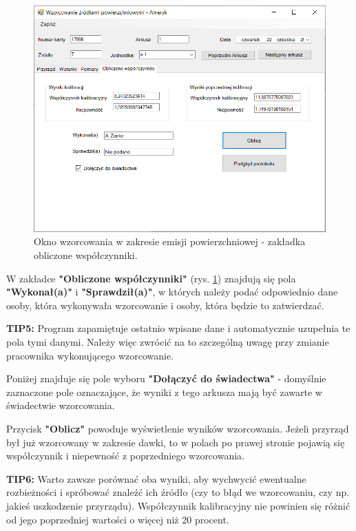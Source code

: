 	\begin{figure}[htb]
		\centering
		\includegraphics[width=\columnwidth]{obrazki/Wzorcowanie/emisja/wspolczynniki.png}
		\caption{Okno wzorcowania w zakresie emisji powierzchniowej - zakładka obliczone współczynniki.}
		\label{emisjaWspolczynniki}
	\end{figure}
	
	W zakładce \textbf{"Obliczone współczynniki"} (rys. \ref{emisjaWspolczynniki}) znajdują się pola \textbf{"Wykonał(a)"} i \textbf{"Sprawdził(a)"}, w których należy podać odpowiednio dane osoby, która wykonywała wzorcowanie i osoby, która będzie to zatwierdzać. 
	
	\textbf{TIP5:} Program zapamiętuje ostatnio wpisane dane i automatycznie uzupełnia te pola tymi danymi. Należy więc zwrócić na to szczególną uwagę przy zmianie pracownika wykonującego wzorcowanie.
	
	Poniżej znajduje się pole wyboru \textbf{"Dołączyć do świadectwa"} - domyślnie zaznaczone pole oznaczające, że wyniki z tego arkusza mają być zawarte w świadectwie wzorcowania.
	
	Przycisk \textbf{"Oblicz"} powoduje wyświetlenie wyników wzorcowania. Jeżeli przyrząd był już wzorcowany w zakresie dawki, to w polach po prawej stronie pojawią się współczynnik i niepewność z poprzedniego wzorcowania. 
	
	\textbf{TIP6:} Warto zawsze porównać oba wyniki, aby wychwycić ewentualne rozbieżności i spróbować znaleźć ich źródło (czy to błąd we wzorcowaniu, czy np. jakieś uszkodzenie przyrządu). Współczynnik kalibracyjny nie powinien się różnić od jego poprzedniej wartości o więcej niż 20 procent.

